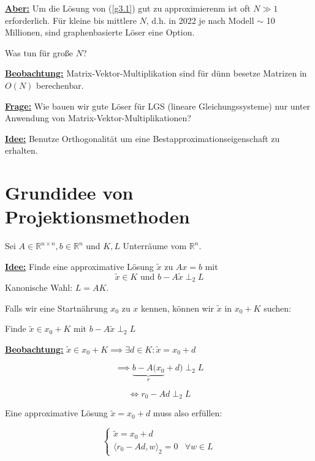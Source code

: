 \documentclass{book}
\def\R{\mathbb{R}}
\begin{document}
            \underline{\textbf{Aber:}} Um die Lösung von (\ref{g3.1}) gut zu approximierenm ist oft $N\gg 1$ erforderlich.
            Für kleine bis mittlere $N$, d.h. in 2022 je nach Modell $\sim$ 10 Millionen, sind graphenbasierte Löser eine Option.

            Was tun für große $N$?

            \underline{\textbf{Beobachtung:}} Matrix-Vektor-Multiplikation sind für dünn besetze Matrizen in $O(N)$ berechenbar.

            \underline{\textbf{Frage:}} Wie bauen wir gute Löser für LGS (lineare Gleichungssysteme) nur unter Anwendung von 
            Matrix-Vektor-Multiplikationen?

            \underline{\textbf{Idee:}} Benutze  Orthogonalität um eine Bestapproximationseigenschaft zu erhalten.

        \section{Grundidee von Projektionsmethoden}

            Sei $A\in\R^{n\times n},b\in\R^n$ und $K,L$ Unterräume vom $\R^n$.

            \underline{\textbf{Idee:}} Finde eine approximative Lösung $\tilde{x}$ zu $Ax=b$ mit 
            \[\tilde{x}\in K \text{ und } b-A\tilde{x}\perp_2 L\]
            Kanonische Wahl: $L=AK$.

            Falls wir eine Startnährung $x_0$ zu $x$ kennen, können wir $\tilde{x}$ in $x_0+K$ suchen:

            Finde $\tilde{x} \in x_0+K \text{ mit } b-A\tilde{x}\perp_2 L$

            \underline{\textbf{Beobachtung:}} $\tilde{x}\in x_0+K\implies \exists d\in K: \tilde{x}=x_0+d$

            \[\implies \underbrace{b-A(x_0}_{r}+d)\perp_2 L\]

            \[\iff r_0-Ad \perp_2 L\]

            Eine approximative Lösung $\tilde{x}=x_0+d$ muss also erfüllen:

            \begin{equation}\label{g3.3}
                \begin{cases}
                    \tilde{x}=x_0+d & \\
                    \langle r_0-Ad,w \rangle_2 = 0  & \forall w\in L
                \end{cases}
            \end{equation}
\end{document}
